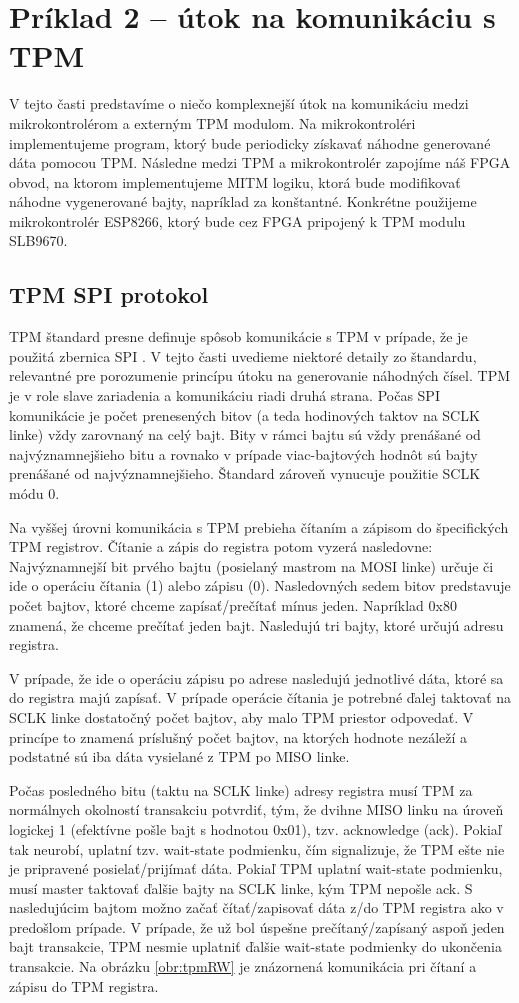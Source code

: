 \section{Príklad 2 -- útok na komunikáciu s TPM} \label{sek:example2}
V tejto časti predstavíme o niečo komplexnejší útok na komunikáciu medzi mikrokontrolérom a externým TPM modulom. Na mikrokontroléri implementujeme program, ktorý bude periodicky získavať náhodne generované dáta pomocou TPM. Následne medzi TPM a mikrokontrolér zapojíme náš FPGA obvod, na ktorom implementujeme MITM logiku, ktorá bude modifikovať náhodne vygenerované bajty, napríklad za konštantné. Konkrétne použijeme mikrokontrolér ESP8266, ktorý bude cez FPGA pripojený k TPM modulu SLB9670.

\subsection{TPM SPI protokol} \label{subsek:tpmSpi}
TPM štandard presne definuje spôsob komunikácie s TPM v prípade, že je použitá zbernica SPI \cite{tpmTis}. V tejto časti uvedieme niektoré detaily zo štandardu, relevantné pre porozumenie princípu útoku na generovanie náhodných čísel. TPM je v role slave zariadenia a komunikáciu riadi druhá strana. Počas SPI komunikácie je počet prenesených bitov (a teda hodinových taktov na SCLK linke) vždy zarovnaný na celý bajt. Bity v rámci bajtu sú vždy prenášané od najvýznamnejšieho bitu a rovnako v prípade viac-bajtových hodnôt sú bajty prenášané od najvýznamnejšieho. Štandard zároveň vynucuje použitie SCLK módu 0.

Na vyššej úrovni komunikácia s TPM prebieha čítaním a zápisom do špecifických TPM registrov. Čítanie a zápis do registra potom vyzerá nasledovne: Najvýznamnejší bit prvého bajtu (posielaný mastrom na MOSI linke) určuje či ide o operáciu čítania (1) alebo zápisu (0). Nasledovných sedem bitov predstavuje počet bajtov, ktoré chceme zapísať/prečítať mínus jeden. Napríklad 0x80 znamená, že chceme prečítať jeden bajt. Nasledujú tri bajty, ktoré určujú adresu registra.

V prípade, že ide o operáciu zápisu po adrese nasledujú jednotlivé dáta, ktoré sa do registra majú zapísať. V prípade operácie čítania je potrebné ďalej taktovať na SCLK linke dostatočný počet bajtov, aby malo TPM priestor odpovedať. V princípe to znamená  príslušný počet bajtov, na ktorých hodnote nezáleží a podstatné sú iba dáta vysielané z TPM po MISO linke.

Počas posledného bitu (taktu na SCLK linke) adresy registra musí TPM za normálnych okolností transakciu potvrdiť, tým, že dvihne MISO linku na úroveň logickej 1 (efektívne pošle bajt s hodnotou 0x01), tzv. acknowledge (ack). Pokiaľ tak neurobí, uplatní tzv. wait-state podmienku, čím signalizuje, že TPM ešte nie je pripravené posielať/prijímať dáta. Pokiaľ TPM uplatní wait-state podmienku, musí master taktovať ďalšie bajty na SCLK linke, kým TPM nepošle ack. S nasledujúcim bajtom možno začať čítať/zapisovať dáta z/do TPM registra ako v predošlom prípade. V prípade, že už bol úspešne prečítaný/zapísaný aspoň jeden bajt transakcie, TPM nesmie uplatniť ďalšie wait-state podmienky do ukončenia transakcie. Na obrázku \ref{obr:tpmRW} je znázornená komunikácia pri čítaní a zápisu do TPM registra.


